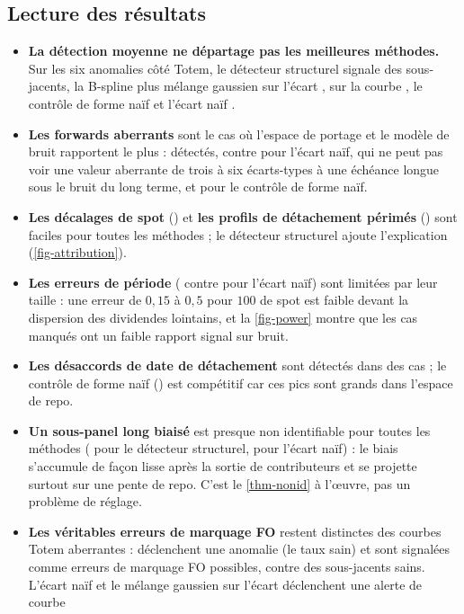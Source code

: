 \subsection{Lecture des résultats}
\begin{itemize}
\item \textbf{La détection moyenne ne départage pas les meilleures méthodes.} Sur les six anomalies côté Totem, le
détecteur structurel signale \vMeanStruct{} des sous-jacents, la B-spline plus mélange gaussien sur l'écart
\vMeanGmmDiff, sur la courbe \vMeanGmmCurve, le contrôle de forme naïf \vMeanShape{} et l'écart naïf \vMeanNaive.
\item \textbf{Les forwards aberrants} sont le cas où l'espace de portage et le modèle de bruit rapportent le plus :
\vFwdStruct{} détectés, contre \vFwdNaive{} pour l'écart naïf, qui ne peut pas voir une valeur aberrante de trois à six
écarts-types à une échéance longue sous le bruit du long terme, et \vFwdShape{} pour le contrôle de forme naïf.
\item \textbf{Les décalages de spot} (\vSpotStruct) et \textbf{les profils de détachement périmés} (\vSeasonStruct) sont
faciles pour toutes les méthodes ; le détecteur structurel ajoute l'explication (\cref{fig-attribution}).
\item \textbf{Les erreurs de période} (\vBucketStruct{} contre \vBucketNaive{} pour l'écart naïf) sont limitées par leur
taille : une erreur de $0{,}15$ à $0{,}5$ pour $100$ de spot est faible devant la dispersion des dividendes lointains, et la
\cref{fig-power} montre que les cas manqués ont un faible rapport signal sur bruit.
\item \textbf{Les désaccords de date de détachement} sont détectés dans \vTimingStruct{} des cas ; le contrôle de forme
naïf (\vTimingShape) est compétitif car ces pics sont grands dans l'espace de repo.
\item \textbf{Un sous-panel long biaisé} est presque non identifiable pour toutes les méthodes (\vPanelStruct{} pour le
détecteur structurel, \vPanelNaive{} pour l'écart naïf) : le biais s'accumule de façon lisse après la sortie de
contributeurs et se projette surtout sur une pente de repo. C'est le \cref{thm-nonid} à l'œuvre, pas un problème de
réglage.
\item \textbf{Les véritables erreurs de marquage FO} restent distinctes des courbes Totem aberrantes : \vFoStruct{}
déclenchent une anomalie (le taux sain) et \vFoMismark{} sont signalées comme erreurs de marquage FO possibles, contre
\vFoClean{} des sous-jacents sains. L'écart naïf et le mélange gaussien sur l'écart déclenchent une alerte de courbe

\end{itemize}
